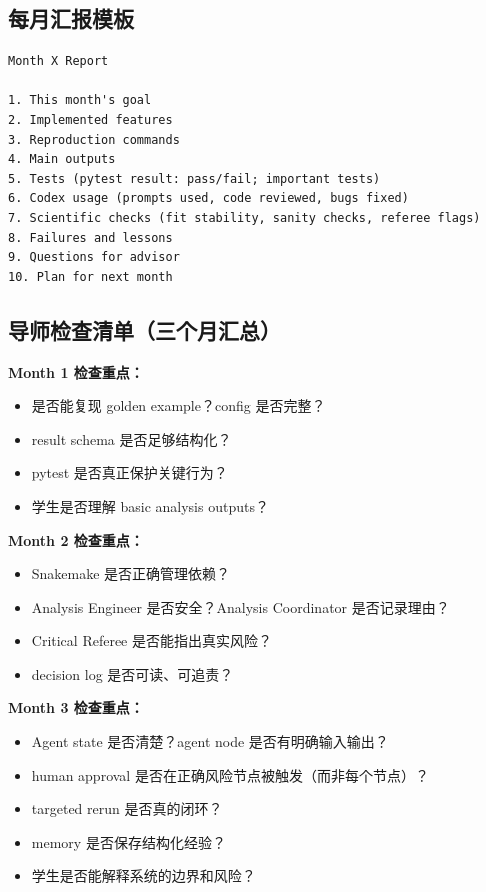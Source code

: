 \documentclass[11pt,a4paper,fontset=fandol]{ctexart}
\begin{document}
\subsection{每月汇报模板}

\begin{lstlisting}
Month X Report

1. This month's goal
2. Implemented features
3. Reproduction commands
4. Main outputs
5. Tests (pytest result: pass/fail; important tests)
6. Codex usage (prompts used, code reviewed, bugs fixed)
7. Scientific checks (fit stability, sanity checks, referee flags)
8. Failures and lessons
9. Questions for advisor
10. Plan for next month
\end{lstlisting}

\subsection{导师检查清单（三个月汇总）}

\textbf{Month 1 检查重点：}
\begin{itemize}
  \item 是否能复现 golden example？config 是否完整？
  \item result schema 是否足够结构化？
  \item pytest 是否真正保护关键行为？
  \item 学生是否理解 basic analysis outputs？
\end{itemize}

\textbf{Month 2 检查重点：}
\begin{itemize}
  \item Snakemake 是否正确管理依赖？
  \item Analysis Engineer 是否安全？Analysis Coordinator 是否记录理由？
  \item Critical Referee 是否能指出真实风险？
  \item decision log 是否可读、可追责？
\end{itemize}

\textbf{Month 3 检查重点：}
\begin{itemize}
  \item Agent state 是否清楚？agent node 是否有明确输入输出？
  \item human approval 是否在正确风险节点被触发（而非每个节点）？
  \item targeted rerun 是否真的闭环？
  \item memory 是否保存结构化经验？
  \item 学生是否能解释系统的边界和风险？
\end{itemize}
\end{document}
